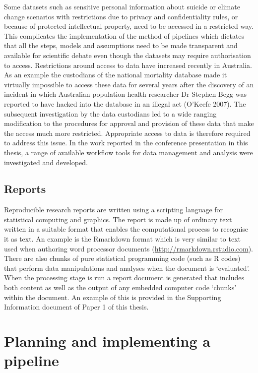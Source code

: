 \documentclass[11pt,a4paper]{article}
\begin{document}
Some datasets such as sensitive personal information about suicide or
climate change scenarios with restrictions due to privacy and
confidentiality rules, or because of protected intellectual property,
need to be accessed in a restricted way. This complicates the
implementation of the method of pipelines which dictates that all the
steps, models and assumptions need to be made transparent and available
for scientific debate even though the datasets may require authorisation
to access. Restrictions around access to data have increased recently in
Australia. As an example the custodians of the national mortality
database made it virtually impossible to access these data for several
years after the discovery of an incident in which Australian population
health researcher Dr Stephen Begg was reported to have hacked into the
database in an illegal act (O'Keefe 2007). The subsequent investigation
by the data custodians led to a wide ranging modification to the
procedures for approval and provision of these data that make the access
much more restricted. Appropriate access to data is therefore required
to address this issue. In the work reported in the conference
presentation in this thesis, a range of available workflow tools for
data management and analysis were investigated and developed.

\subsection{Reports}\label{reports}

Reproducible research reports are written using a scripting language for
statistical computing and graphics. The report is made up of ordinary
text written in a suitable format that enables the computational process
to recognise it as text. An example is the Rmarkdown format which is
very similar to text used when authoring word processor documents
(\url{http://rmarkdown.rstudio.com}). There are also chunks of pure
statistical programming code (such as R codes) that perform data
manipulations and analyses when the document is `evaluated'. When the
processing stage is run a report document is generated that includes
both content as well as the output of any embedded computer code
`chunks' within the document. An example of this is provided in the
Supporting Information document of Paper 1 of this thesis.

\section{Planning and implementing a
pipeline}\label{planning-and-implementing-a-pipeline}
\end{document}
